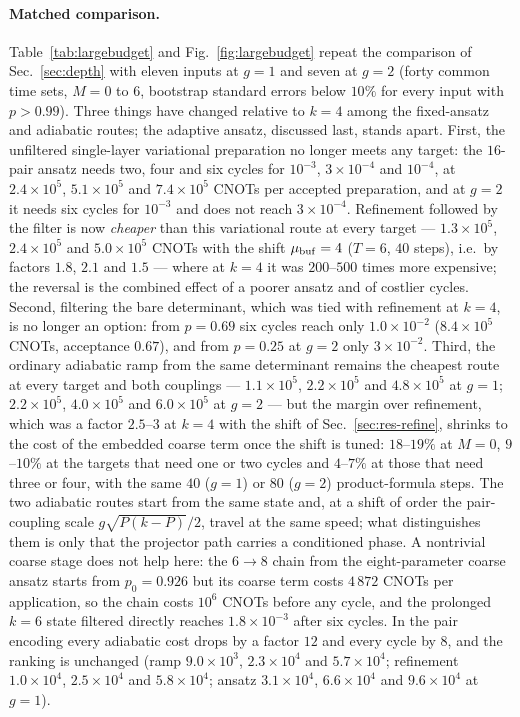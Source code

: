 \documentclass[
  aps,            %
  prc,            %
  reprint,        %
  superscriptaddress,
  floatfix,
  nofootinbib
]{revtex4-2}
\begin{document}
\paragraph{Matched comparison.}
Table~\ref{tab:largebudget} and Fig.~\ref{fig:largebudget} repeat the
comparison of Sec.~\ref{sec:depth} with eleven inputs at $g=1$ and seven at
$g=2$ (forty common time sets, $M=0$ to $6$, bootstrap standard errors
below $10\%$ for every input with $p>0.99$).  Three things have changed
relative to $k=4$ among the fixed-ansatz and adiabatic routes; the adaptive
ansatz, discussed last, stands apart.  First, the unfiltered single-layer
variational preparation no longer meets any target: the $16$-pair ansatz
needs two, four and six cycles for
$10^{-3}$, $3\times10^{-4}$ and $10^{-4}$, at $2.4\times10^{5}$,
$5.1\times10^{5}$ and $7.4\times10^{5}$ CNOTs per accepted preparation, and
at $g=2$ it needs six cycles for $10^{-3}$ and does not reach
$3\times10^{-4}$.  Refinement followed by the filter is now \emph{cheaper}
than this variational route at every target --- $1.3\times10^{5}$,
$2.4\times10^{5}$ and $5.0\times10^{5}$ CNOTs with the shift
$\mu_{\rm buf}=4$ ($T=6$, $40$ steps), i.e.\ by factors $1.8$, $2.1$ and
$1.5$ --- where at $k=4$ it was $200$--$500$ times more expensive; the
reversal is the combined effect of a poorer ansatz and of costlier cycles.
Second, filtering the bare determinant, which was tied with refinement at
$k=4$, is no longer an option: from $p=0.69$ six cycles reach only
$1.0\times10^{-2}$ ($8.4\times10^{5}$ CNOTs, acceptance $0.67$), and from
$p=0.25$ at $g=2$ only $3\times10^{-2}$.  Third, the ordinary adiabatic
ramp from the same determinant remains the cheapest route at every target
and both couplings --- $1.1\times10^{5}$, $2.2\times10^{5}$ and
$4.8\times10^{5}$ at $g=1$; $2.2\times10^{5}$, $4.0\times10^{5}$ and
$6.0\times10^{5}$ at $g=2$ --- but the margin over refinement, which was a
factor $2.5$--$3$ at $k=4$ with the shift of Sec.~\ref{sec:res-refine},
shrinks to the cost of the embedded coarse term once the shift is tuned:
$18$--$19\%$ at $M=0$, $9$--$10\%$ at the targets that need one or two
cycles and $4$--$7\%$ at those that need three or four, with the same $40$
($g=1$) or $80$ ($g=2$) product-formula steps.  The two adiabatic routes start from the same state and, at a
shift of order the pair-coupling scale $g\sqrt{P(k-P)}/2$, travel at the
same speed; what distinguishes them is only that the projector path
carries a conditioned phase.  A nontrivial coarse stage does not help here:
the $6\to8$ chain from the eight-parameter coarse ansatz starts from
$p_0=0.926$ but its coarse term costs $4\,872$ CNOTs per application, so the
chain costs $10^{6}$ CNOTs before any cycle, and the prolonged $k=6$ state
filtered directly reaches $1.8\times10^{-3}$ after six cycles.  In the pair
encoding every adiabatic cost drops by a factor $12$ and every cycle by $8$,
and the ranking is unchanged (ramp $9.0\times10^{3}$, $2.3\times10^{4}$ and
$5.7\times10^{4}$; refinement $1.0\times10^{4}$, $2.5\times10^{4}$ and
$5.8\times10^{4}$; ansatz $3.1\times10^{4}$, $6.6\times10^{4}$ and
$9.6\times10^{4}$ at $g=1$).
\end{document}
